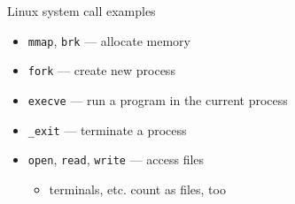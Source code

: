\begin{frame}{Linux system call examples}
\begin{itemize}
\item {\tt mmap}, {\tt brk} --- allocate memory
\item {\tt fork} --- create new process
\item {\tt execve} --- run a program in the current process
\item {\tt \_exit} --- terminate a process
\item {\tt open}, {\tt read}, {\tt write} --- access files
    \begin{itemize}
    \item terminals, etc. count as files, too
    \end{itemize}
\end{itemize}
\end{frame}

